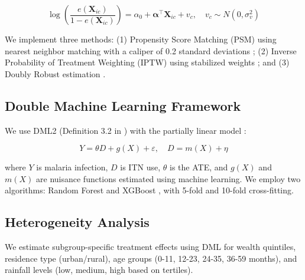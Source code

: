 \[
\log\left(\frac{e(\mathbf{X}_{ic})}{1 - e(\mathbf{X}_{ic})}\right) = \alpha_0 + \boldsymbol{\alpha}^\top \mathbf{X}_{ic} + v_c, \quad v_c \sim N(0, \sigma_v^2)
\]

We implement three methods: (1) Propensity Score Matching (PSM) using nearest neighbor matching with a caliper of 0.2 standard deviations \citep{austin2011introduction, austin2010optimal}; (2) Inverse Probability of Treatment Weighting (IPTW) using stabilized weights \citep{cole2008constructing}; and (3) Doubly Robust estimation \citep{kang2007average}.

\subsection{Double Machine Learning Framework}

We use DML2 (Definition 3.2 in \citealp{chernozhukov2018double}) with the partially linear model \citep{nie2021quasi}:

\[
Y = \theta D + g(X) + \varepsilon, \quad D = m(X) + \eta
\]

where $Y$ is malaria infection, $D$ is ITN use, $\theta$ is the ATE, and $g(X)$ and $m(X)$ are nuisance functions estimated using machine learning. We employ two algorithms: Random Forest \citep{breiman2001random} and XGBoost \citep{chen2016xgboost}, with 5-fold and 10-fold cross-fitting.

\subsection{Heterogeneity Analysis}

We estimate subgroup-specific treatment effects using DML for wealth quintiles, residence type (urban/rural), age groups (0-11, 12-23, 24-35, 36-59 months), and rainfall levels (low, medium, high based on tertiles).